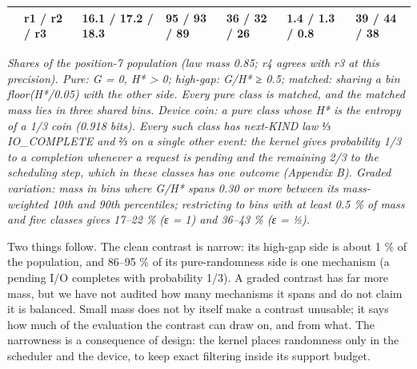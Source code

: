 \documentclass[10pt]{article}
\begin{document}
\begin{longtable}[]{@{}lllllll@{}}
\begin{minipage}[t]{0.12\columnwidth}
\end{minipage} & \begin{minipage}[t]{0.12\columnwidth}\raggedright
r1 / r2 / r3\strut
\end{minipage} & \begin{minipage}[t]{0.12\columnwidth}\raggedright
16.1 / 17.2 / 18.3\strut
\end{minipage} & \begin{minipage}[t]{0.12\columnwidth}\raggedright
95 / 93 / 89\strut
\end{minipage} & \begin{minipage}[t]{0.12\columnwidth}\raggedright
36 / 32 / 26\strut
\end{minipage} & \begin{minipage}[t]{0.12\columnwidth}\raggedright
1.4 / 1.3 / 0.8\strut
\end{minipage} & \begin{minipage}[t]{0.12\columnwidth}\raggedright
39 / 44 / 38\strut
\end{minipage}\tabularnewline
\bottomrule
\end{longtable}

\emph{Shares of the position-7 population (law mass 0.85; r4 agrees with r3 at this precision). Pure: G = 0, H* \textgreater{} 0;
high-gap: G/H* ≥ 0.5; matched: sharing a bin floor(H*/0.05) with the other side. Every pure class is matched, and the
matched mass lies in three shared bins. Device coin: a pure class whose H* is the entropy of a 1/3 coin (0.918 bits). Every such class has next-KIND law
⅓ IO\_COMPLETE and ⅔ on a single other event: the kernel gives probability 1/3 to a completion whenever a request is
pending and the remaining 2/3 to the scheduling step, which in these classes has one outcome (Appendix B).
Graded variation: mass in bins where G/H* spans 0.30 or more between its mass-weighted 10th and 90th percentiles;
restricting to bins with at least 0.5 \% of mass and five classes gives 17--22 \% (ε = 1) and 36--43 \% (ε = ½).}

Two things follow. The clean contrast is narrow: its high-gap side is about 1 \% of the population, and 86--95 \% of its
pure-randomness side is one mechanism (a pending I/O completes with probability 1/3). A graded contrast has far more
mass, but we have not audited how many mechanisms it spans and do not claim it is balanced. Small mass does not by itself
make a contrast unusable; it says how much of the evaluation the contrast can draw on, and from what. The narrowness is
a consequence of design: the kernel places randomness only in the scheduler and the device, to keep exact filtering
inside its support budget.
\end{document}
